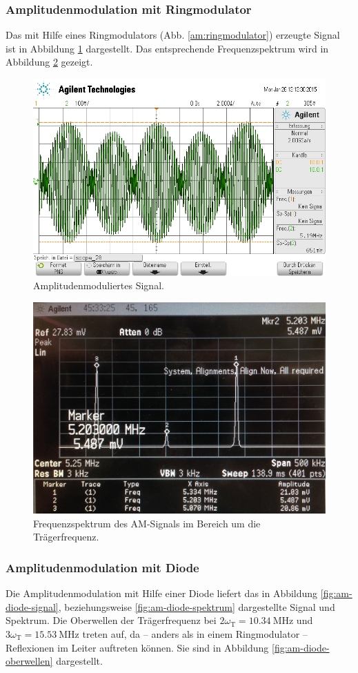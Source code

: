 \subsubsection{Amplitudenmodulation mit Ringmodulator}
\label{subsubsec:am-ringmodulator}
Das mit Hilfe eines Ringmodulators (Abb. \ref{am:ringmodulator}) erzeugte Signal ist in Abbildung
\ref{fig:am-signal} dargestellt.
Das entsprechende Frequenzspektrum wird in Abbildung \ref{fig:am-spektrum}
gezeigt.
\begin{figure}
    \centering
    \includegraphics[width=0.8\linewidth]{images/am-signal.png}
    \caption{Amplitudenmoduliertes Signal.}
    \label{fig:am-signal}
\end{figure}
\begin{figure}
    \centering
    \includegraphics[width=0.8\linewidth]{images/am-spektrum.jpg}
    \caption{
        Frequenzspektrum des AM-Signals im Bereich um die
        Trägerfrequenz.
    }
    \label{fig:am-spektrum}
\end{figure}

\subsubsection{Amplitudenmodulation mit Diode}
\label{subsubsec:am-ringmodulator}
Die Amplitudenmodulation mit Hilfe einer Diode liefert das in Abbildung
\ref{fig:am-diode-signal}, beziehungsweise \ref{fig:am-diode-spektrum}
dargestellte Signal und Spektrum. Die Oberwellen der Trägerfrequenz bei
$2\omega_\text{T} = \SI{10.34}{\mega\hertz}$ und
$3\omega_\text{T} = \SI{15.53}{\mega\hertz}$ treten auf, da -- anders als in
einem Ringmodulator -- Reflexionen im Leiter auftreten können.
Sie sind in Abbildung \ref{fig:am-diode-oberwellen} dargestellt.

